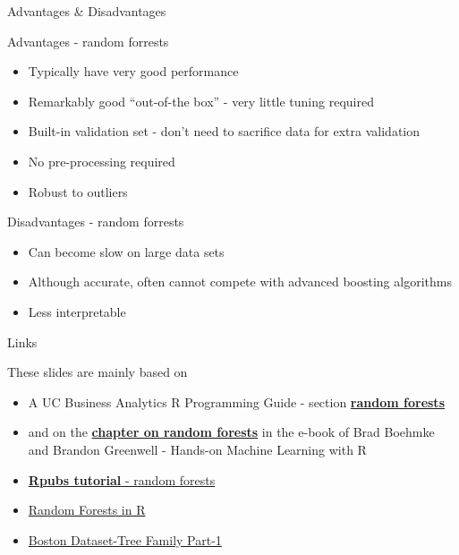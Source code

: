 \documentclass[
  10pt,
  ignorenonframetext,
]{beamer}
\providecommand{\tightlist}{%
  \setlength{\itemsep}{0pt}\setlength{\parskip}{0pt}}
\begin{document}
\begin{frame}{Advantages \& Disadvantages}
\protect\hypertarget{advantages-disadvantages}{}

\begin{block}{Advantages - random forrests}

\begin{itemize}
\tightlist
\item
  Typically have very good performance
\item
  Remarkably good ``out-of-the box'' - very little tuning required
\item
  Built-in validation set - don't need to sacrifice data for extra
  validation
\item
  No pre-processing required
\item
  Robust to outliers
\end{itemize}

\end{block}

\begin{block}{Disadvantages - random forrests}

\begin{itemize}
\tightlist
\item
  Can become slow on large data sets
\item
  Although accurate, often cannot compete with advanced boosting
  algorithms
\item
  Less interpretable
\end{itemize}

\end{block}

\end{frame}

\begin{frame}{Links}
\protect\hypertarget{links}{}

These slides are mainly based on

\begin{itemize}
\item
  A UC Business Analytics R Programming Guide - section
  \href{http://uc-r.github.io/random_forests}{\textbf{random forests}}
\item
  and on the
  \href{https://bradleyboehmke.github.io/HOML/random-forest.html}{\textbf{chapter
  on random forests}} in the e-book of Brad Boehmke and Brandon
  Greenwell - Hands-on Machine Learning with R
\item
  \href{https://rpubs.com/nuhorchak/randomForest}{\textbf{Rpubs
  tutorial} - random forests}
\item
  \href{https://rpubs.com/anish20/RandomForests}{Random Forests in R}
\item
  \href{https://rpubs.com/Hgoswami/368562}{Boston Dataset-Tree Family
  Part-1}
\end{itemize}

\end{frame}
\end{document}
